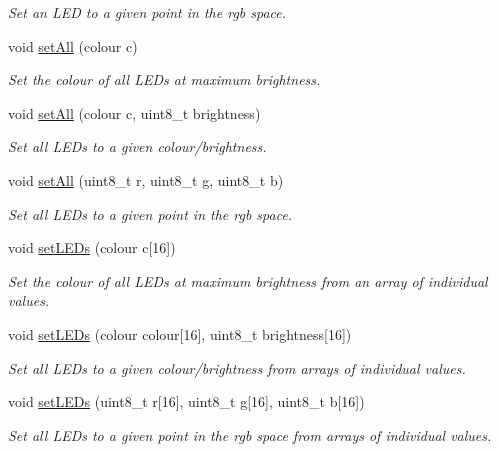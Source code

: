 \begin{DoxyCompactItemize}
\begin{DoxyCompactList}\small\item\em Set an L\+E\+D to a given point in the rgb space. \end{DoxyCompactList}\item 
void \hyperlink{group___engduino_l_e_ds_ga50aaa6fe93206e0fa0f037b4a7be3284}{set\+All} (colour c)
\begin{DoxyCompactList}\small\item\em Set the colour of all L\+E\+Ds at maximum brightness. \end{DoxyCompactList}\item 
void \hyperlink{group___engduino_l_e_ds_ga0047bf22f224f1d2bfff77d04b89e89f}{set\+All} (colour c, uint8\+\_\+t brightness)
\begin{DoxyCompactList}\small\item\em Set all L\+E\+Ds to a given colour/brightness. \end{DoxyCompactList}\item 
void \hyperlink{group___engduino_l_e_ds_gaddff7887dd930a0b8865c92892c0f899}{set\+All} (uint8\+\_\+t r, uint8\+\_\+t g, uint8\+\_\+t b)
\begin{DoxyCompactList}\small\item\em Set all L\+E\+Ds to a given point in the rgb space. \end{DoxyCompactList}\item 
void \hyperlink{group___engduino_l_e_ds_ga640f4a7798f27d483f5727baaab12c2e}{set\+L\+E\+Ds} (colour c\mbox{[}16\mbox{]})
\begin{DoxyCompactList}\small\item\em Set the colour of all L\+E\+Ds at maximum brightness from an array of individual values. \end{DoxyCompactList}\item 
void \hyperlink{group___engduino_l_e_ds_ga92a706323b3e89453ee6f6b7f2057a59}{set\+L\+E\+Ds} (colour colour\mbox{[}16\mbox{]}, uint8\+\_\+t brightness\mbox{[}16\mbox{]})
\begin{DoxyCompactList}\small\item\em Set all L\+E\+Ds to a given colour/brightness from arrays of individual values. \end{DoxyCompactList}\item 
void \hyperlink{group___engduino_l_e_ds_ga48ac99a4c0feb705368a0eecb6eb6c6d}{set\+L\+E\+Ds} (uint8\+\_\+t r\mbox{[}16\mbox{]}, uint8\+\_\+t g\mbox{[}16\mbox{]}, uint8\+\_\+t b\mbox{[}16\mbox{]})
\begin{DoxyCompactList}\small\item\em Set all L\+E\+Ds to a given point in the rgb space from arrays of individual values. \end{DoxyCompactList}\item 

\end{DoxyCompactItemize}
